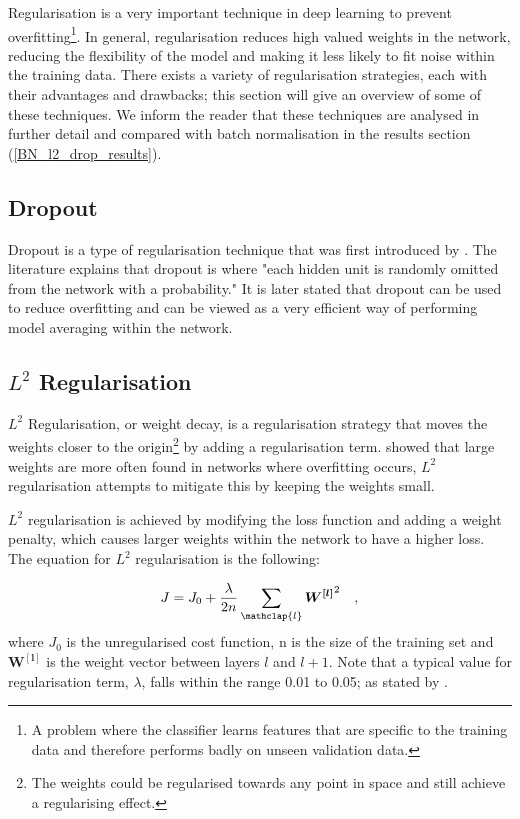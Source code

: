     Regularisation is a very important technique in deep learning to prevent overfitting\footnote{A problem where the classifier learns features that are specific to the training data and therefore performs badly on unseen validation data.}. In general, regularisation reduces high valued weights in the network, reducing the flexibility of the model and making it less likely to fit noise within the training data. There exists a variety of regularisation strategies, each with their advantages and drawbacks; this section will give an overview of some of these techniques. We inform the reader that these techniques are analysed in further detail and compared with batch normalisation in the results section (\ref{BN_l2_drop_results}).

    \subsection{Dropout} 
        Dropout is a type of regularisation technique that was first introduced by \cite{dropout_hinton}. The literature explains that dropout is where "each hidden unit is randomly omitted from the network with a probability." It is later stated that dropout can be used to reduce overfitting and can be viewed as a very efficient way of performing model averaging within the network. 
        
    \subsection{$L^2$ Regularisation} \label{l2_regularisation}
        $L^2$ Regularisation, or weight decay, is a regularisation strategy that moves the weights closer to the origin\footnote{The weights could be regularised towards any point in space and still achieve a regularising effect.} by adding a regularisation term. \cite{regularising_comparison} showed that large weights are more often found in networks where overfitting occurs, $L^2$ regularisation attempts to mitigate this by keeping the weights small. 
        
        $L^2$ regularisation is achieved by modifying the loss function and adding a weight penalty, which causes larger weights within the network to have a higher loss. The equation for $L^2$ regularisation is the following:
        
        \begin{equation} \label{l2_equation}
            J = J_0 + \frac{\lambda}{2n} \sum_{\mathclap{l}}^{} \boldsymbol{W^{[l]}}^2 \quad,
        \end{equation}
        where $J_0$ is the unregularised cost function, n is the size of the training set and  $\boldsymbol{W^{[l]}}$ is the weight vector between layers $l$ and $l+1$. Note that a typical value for regularisation term, $\lambda$, falls within the range 0.01 to 0.05; as stated by \cite{regularising_comparison}.
        


